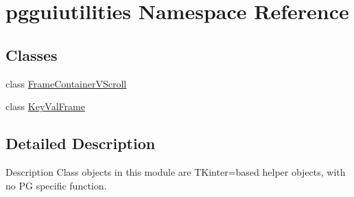 \hypertarget{namespacepgguiutilities}{}\section{pgguiutilities Namespace Reference}
\label{namespacepgguiutilities}
\subsection*{Classes}
\begin{DoxyCompactItemize}
\item 
class \hyperlink{classpgguiutilities_1_1FrameContainerVScroll}{Frame\+Container\+V\+Scroll}
\item 
class \hyperlink{classpgguiutilities_1_1KeyValFrame}{Key\+Val\+Frame}
\end{DoxyCompactItemize}


\subsection{Detailed Description}
\begin{DoxyVerb}Description
Class objects in this module are TKinter=based
helper objects, with no PG specific function.\end{DoxyVerb}
 